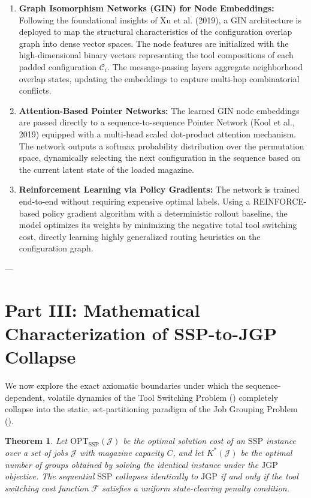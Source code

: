 \documentclass[11pt,a4paper]{article}
\theoremstyle{plain}
\newtheorem{theorem}{Theorem}[section]
\theoremstyle{definition}
\newcommand{\OPT}{\text{OPT}}
\newcommand{\JGP}{\text{JGP}}
\newcommand{\SSP}{\text{SSP}}
\begin{document}
\begin{enumerate}[leftmargin=1.5em]
	\item \textbf{Graph Isomorphism Networks (GIN) for Node Embeddings:} Following the foundational insights of Xu et al. (2019), a GIN architecture is deployed to map the structural characteristics of the configuration overlap graph into dense vector spaces. The node features are initialized with the high-dimensional binary vectors representing the tool compositions of each padded configuration $\mathcal{C}_i$. The message-passing layers aggregate neighborhood overlap states, updating the embeddings to capture multi-hop combinatorial conflicts.
	\item \textbf{Attention-Based Pointer Networks:} The learned GIN node embeddings are passed directly to a sequence-to-sequence Pointer Network (Kool et al., 2019) equipped with a multi-head scaled dot-product attention mechanism. The network outputs a softmax probability distribution over the permutation space, dynamically selecting the next configuration in the sequence based on the current latent state of the loaded magazine.
	\item \textbf{Reinforcement Learning via Policy Gradients:} The network is trained end-to-end without requiring expensive optimal labels. Using a REINFORCE-based policy gradient algorithm with a deterministic rollout baseline, the model optimizes its weights by minimizing the negative total tool switching cost, directly learning highly generalized routing heuristics on the configuration graph.
\end{enumerate}

---

\section{Part III: Mathematical Characterization of SSP-to-JGP Collapse}

We now explore the exact axiomatic boundaries under which the sequence-dependent, volatile dynamics of the Tool Switching Problem (\SSP) completely collapse into the static, set-partitioning paradigm of the Job Grouping Problem (\JGP).

\begin{theorem}
	Let $\OPT_{\SSP}(\mathcal{J})$ be the optimal solution cost of an $\SSP$ instance over a set of jobs $\mathcal{J}$ with magazine capacity $C$, and let $K^*(\mathcal{J})$ be the optimal number of groups obtained by solving the identical instance under the $\JGP$ objective. The sequential $\SSP$ collapses identically to $\JGP$ if and only if the tool switching cost function $\mathcal{F}$ satisfies a uniform state-clearing penalty condition.
\end{theorem}
\end{document}
